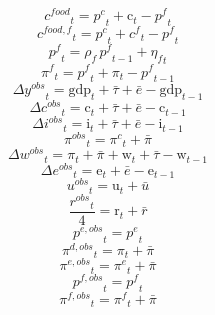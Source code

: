 \begin{dmath}
{{c^{food}}}_{t}={{p^{c}}}_{t}+{{\mathrm{c}}}_{t}-{{p^{f}}}_{t}
\end{dmath}
\begin{dmath}
{{c^{food,f}}}_{t}={{p^{c}}}_{t}+{{c^{f}}}_{t}-{{p^{f}}}_{t}
\end{dmath}
\begin{dmath}
{{p^{f}}}_{t}={{\rho_{f}}}\, {{p^{f}}}_{t-1}+{{\eta_{f}}}_{t}
\end{dmath}
\begin{dmath}
{{\pi^{f}}}_{t}={{p^{f}}}_{t}+{{\pi}}_{t}-{{p^{f}}}_{t-1}
\end{dmath}
\begin{dmath}
{{\Delta y^{obs}}}_{t}={{\mathrm{gdp}}}_{t}+{{\bar{\tau}}}+{{\bar{e}}}-{{\mathrm{gdp}}}_{t-1}
\end{dmath}
\begin{dmath}
{{\Delta c^{obs}}}_{t}={{\mathrm{c}}}_{t}+{{\bar{\tau}}}+{{\bar{e}}}-{{\mathrm{c}}}_{t-1}
\end{dmath}
\begin{dmath}
{{\Delta i^{obs}}}_{t}={{\mathrm{i}}}_{t}+{{\bar{\tau}}}+{{\bar{e}}}-{{\mathrm{i}}}_{t-1}
\end{dmath}
\begin{dmath}
{{\pi^{obs}}}_{t}={{\pi^{c}}}_{t}+{{\bar{\pi}}}
\end{dmath}
\begin{dmath}
{{\Delta w^{obs}}}_{t}={{\pi}}_{t}+{{\bar{\pi}}}+{{\mathrm{w}}}_{t}+{{\bar{\tau}}}-{{\mathrm{w}}}_{t-1}
\end{dmath}
\begin{dmath}
{{\Delta e^{obs}}}_{t}={{\mathrm{e}}}_{t}+{{\bar{e}}}-{{\mathrm{e}}}_{t-1}
\end{dmath}
\begin{dmath}
{{u^{obs}}}_{t}={{\mathrm{u}}}_{t}+{{\bar{u}}}
\end{dmath}
\begin{dmath}
\frac{{{r^{obs}}}_{t}}{4}={{\mathrm{r}}}_{t}+{{\bar{r}}}
\end{dmath}
\begin{dmath}
{{p^{e,obs}}}_{t}={{p^{e}}}_{t}
\end{dmath}
\begin{dmath}
{{\pi^{d,obs}}}_{t}={{\pi}}_{t}+{{\bar{\pi}}}
\end{dmath}
\begin{dmath}
{{\pi^{e,obs}}}_{t}={{\pi^{e}}}_{t}+{{\bar{\pi}}}
\end{dmath}
\begin{dmath}
{{p^{f,obs}}}_{t}={{p^{f}}}_{t}
\end{dmath}
\begin{dmath}
{{\pi^{f,obs}}}_{t}={{\pi^{f}}}_{t}+{{\bar{\pi}}}
\end{dmath}
